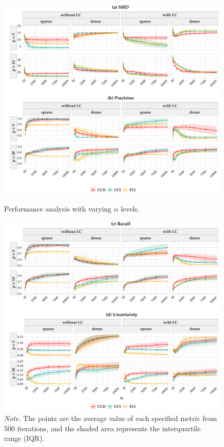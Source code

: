 \documentclass[twoside, 11pt]{article}
\begin{document}
\begin{appendices}
\begin{figure}[!htb]
    \centering
        \caption{Performance analysis  with varying $\alpha$ levels.}
        \includegraphics[width=1\textwidth]{figures/varyingalpha_result1.pdf}
    \label{fig:H1}
\end{figure}

\begin{figure}[!htb] \ContinuedFloat
    \centering
        \includegraphics[width=1\textwidth]{figures/varyingalpha_result2.pdf}
        \caption*{\small{\textit{Note.} The points are the average value of each specified metric from 500 iterations, and the shaded area represents the interquartile range (IQR).}}
\end{figure}


\end{appendices}
\end{document}
